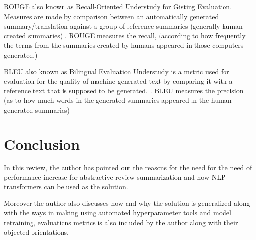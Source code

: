 \documentclass[manuscript,screen,natbib=false]{acmart}
\begin{document}
ROUGE also known as Recall-Oriented Understudy for Gisting Evaluation. Measures are made by comparison between an automatically generated summary/translation against a group of reference summaries (generally human created summaries) \cite{lin_2004}. ROUGE measures the recall, (according to how frequently the terms from the summaries created by humans appeared in those computers - generated.)

BLEU also known as Bilingual Evaluation Understudy is a metric used for evaluation for the quality of machine generated text by comparing it with a reference text that is supposed to be generated. \cite{steinberger_ježek}. BLEU measures the precision (as to how much words in the generated summaries appeared in the human generated summaries)

\section{Conclusion}
In this review, the author has pointed out the reasons for the need for the need of performance increase for abstractive review summarization and how NLP transformers can be used as the solution.

Moreover the author also discusses how and why the solution is generalized along with the ways in making using automated hyperparameter tools and model retraining, evaluations metrics is also included by the author along with their objected orientations.


% 
% 
\printbibliography




\end{document}
